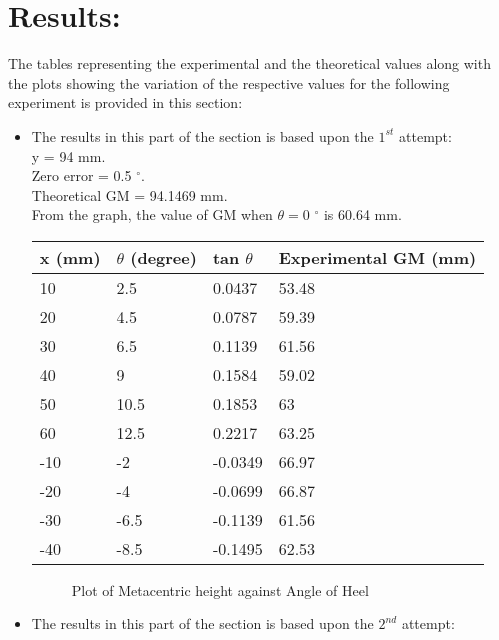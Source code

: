 \documentclass[12pt,a4paper]{article}
\begin{document}
\section{Results:}
The tables representing the experimental and the theoretical values along with the plots showing the variation of the respective values for the following experiment is provided in this section:\\
\begin{itemize}
\item The results in this part of the section is based upon the $1^{st}$ attempt:\\
y = 94 mm.\\
Zero error = 0.5  $^{\circ}$. \\
Theoretical GM = 94.1469 mm.\\
From the graph, the value of GM when $\theta = $0  $^{\circ}$ is 60.64 mm.\\
\begin{table}[!ht]
\begin{center}
\begin{tabular}{|p{2cm}|p{2cm}|p{2cm}|p{6cm}|}
\hline
x (mm) & $\theta$ (degree) & tan $\theta$ & Experimental GM (mm) \\
\hline
10 & 2.5 & 0.0437 & 53.48\\
20 & 4.5 & 0.0787 & 59.39\\
30 & 6.5 & 0.1139 & 61.56\\
40 & 9 & 0.1584 & 59.02\\
50 & 10.5 & 0.1853 & 63\\
60 & 12.5 & 0.2217 & 63.25\\
-10 & -2 & -0.0349 & 66.97\\
-20 & -4 & -0.0699 & 66.87\\
-30 & -6.5 & -0.1139 & 61.56\\
-40 & -8.5 & -0.1495 & 62.53\\
\hline
\end{tabular}
\end{center}
\end{table}
\newpage
\begin{figure}[!ht]
	\begin{center}
	\end{center}
	\caption{Plot of Metacentric height against Angle of Heel}
\end{figure}
\item The results in this part of the section is based upon the $2^{nd}$ attempt:\\

\end{itemize}
\end{document}
